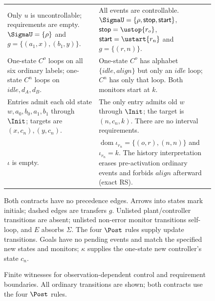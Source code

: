 \begin{figure}[!htbp]
{\begin{tabular}{@{}p{.475\linewidth}p{.475\linewidth}@{}}
Only $u$ is uncontrollable; requirements are empty. $\SigmaU=\{\rho\}$ and $g=\{(a_1,x),(b_1,y)\}$.
& All events are controllable. $\SigmaU=\{\rho,\mathsf{stop},\mathsf{start}\}$, $\mathsf{stop}=\ustop{r_o}$, $\mathsf{start}=\ustart{r_n}$ and $g=\{(r,n)\}$.\\
One-state $C^o$ loops on all six ordinary labels; one-state $C^n$ loops on $idle,d_A,d_B$.
& One-state $C^o$ has alphabet $\{idle,align\}$ but only an $idle$ loop; $C^n$ has only that loop. Both monitors start at $k$.\\
Entries admit each old state $w,a_0,b_0,a_1,b_1$ through $\Init$; targets are $(x,c_n),(y,c_n)$.
& The only entry admits old $w$ through $\Init$; the target is $(n,c_n,k)$. There are no interval requirements.\\
$\iota$ is empty.
& $\operatorname{dom}\iota_{r_n}=\{(o,r),(n,n)\}$ and $\iota_{r_n}=k$. The history interpretation erases pre-activation ordinary events and forbids $align$ afterward (exact RS).\\\bottomrule
\end{tabular}
\par\smallskip
Both contracts have no precedence edges. Arrows into states mark initials; dashed edges are transfers $g$. Unlisted plant/controller transitions are absent; unlisted non-error monitor transitions self-loop, and $E$ absorbs $\Sigma$. The four $\Post$ rules supply update transitions. Goals have no pending events and match the specified new states and monitors; $\kappa$ supplies the one-state new controller's state $c_n$.
}

\caption{Finite witnesses for observation-dependent control and requirement boundaries. All ordinary transitions are shown; both contracts use the four $\Post$ rules.}
\label{fig:other-witnesses}
\end{figure}
